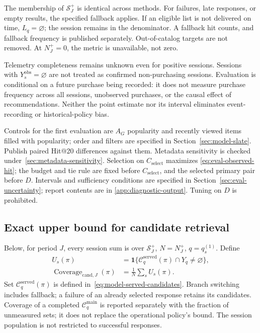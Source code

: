 \documentclass[12pt,a4paper]{article}
\newcommand{\ind}{\mathbf 1}
\theoremstyle{plainru}
\begin{document}
The membership of $\mathcal S_J^+$ is identical across methods. For failures,
late responses, or empty results, the specified fallback applies.
If an eligible list is not delivered on time, $L_q=\varnothing$;
the session remains in the denominator. A fallback hit counts,
and fallback frequency is published separately. Out-of-catalog targets are not removed.
At $N_J^+=0$, the metric is unavailable, not zero.

Telemetry completeness remains unknown even for positive sessions.
Sessions with $Y_s^{\mathrm{obs}}=\varnothing$ are not treated as confirmed
non-purchasing sessions. Evaluation is conditional on a future purchase being recorded:
it does not measure purchase frequency across all sessions, unobserved purchases,
or the causal effect of recommendations. Neither the point estimate nor its interval
eliminates event-recording or historical-policy bias.

Controls for the first evaluation are $A_G$ popularity and recently viewed
items filled with popularity; order and filters are specified
in Section~\ref{sec:model-slate}. Publish paired Hit@20 differences against them.
Metadata sensitivity is checked under~\ref{sec:metadata-sensitivity}.
Selection on $C_{\mathrm{select}}$ maximizes
\eqref{eq:eval-observed-hit}; the budget and tie rule are fixed before
$C_{\mathrm{select}}$, and the selected primary pair before $D$.
Intervals and sufficiency conditions
are specified in Section~\ref{sec:eval-uncertainty}; report contents are in
\ref{app:diagnostic-output}. Tuning on $D$ is prohibited.

\subsection{Exact upper bound for candidate retrieval}
\label{sec:eval-candidate-bound}

Below, for period $J$, every session sum is over $\mathcal S_J^+$,
$N=N_J^+$, $q=q_s^{(1)}$. Define
\begin{align}
 U_s(\pi)&=\ind\{\mathcal C_q^{\mathrm{served}}(\pi)\cap Y_q\ne\varnothing\},
 \label{eq:eval-candidate-hit}\\
 \operatorname{Coverage}_{\mathrm{cand},J}(\pi)
 &=\frac1N\sum_s U_s(\pi).
 \label{eq:eval-candidate-por}
\end{align}
Set $\mathcal C_q^{\mathrm{served}}(\pi)$ is defined
in~\eqref{eq:model-served-candidates}. Branch switching includes
fallback; a failure of an already selected response retains its candidates.
Coverage of a completed $\mathcal C_q^{\mathrm{main}}$ is reported separately
with the fraction of unmeasured sets; it does not replace the operational policy's bound.
The session population is not restricted to successful responses.
\end{document}
